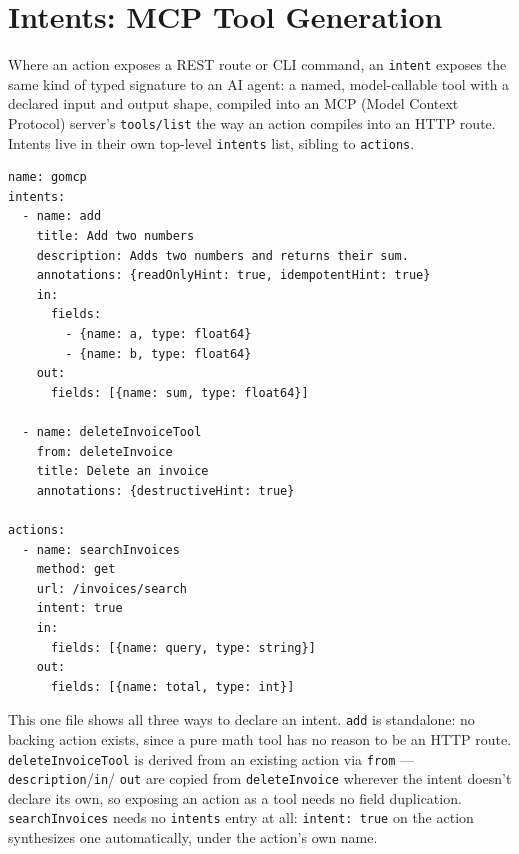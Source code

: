 \section{Intents: MCP Tool Generation}
\label{sec:intents}

Where an action exposes a REST route or CLI command, an
\texttt{intent} exposes the same kind of typed signature to an AI
agent: a named, model-callable tool with a declared input and output
shape, compiled into an MCP (Model Context Protocol) server's
\texttt{tools/list} the way an action compiles into an HTTP route.
Intents live in their own top-level \texttt{intents} list, sibling to
\texttt{actions}.

\begin{lstlisting}
name: gomcp
intents:
  - name: add
    title: Add two numbers
    description: Adds two numbers and returns their sum.
    annotations: {readOnlyHint: true, idempotentHint: true}
    in:
      fields:
        - {name: a, type: float64}
        - {name: b, type: float64}
    out:
      fields: [{name: sum, type: float64}]

  - name: deleteInvoiceTool
    from: deleteInvoice
    title: Delete an invoice
    annotations: {destructiveHint: true}

actions:
  - name: searchInvoices
    method: get
    url: /invoices/search
    intent: true
    in:
      fields: [{name: query, type: string}]
    out:
      fields: [{name: total, type: int}]
\end{lstlisting}

This one file shows all three ways to declare an intent. \texttt{add}
is standalone: no backing action exists, since a pure math tool has no
reason to be an HTTP route. \texttt{deleteInvoiceTool} is derived from
an existing action via \texttt{from} --- \texttt{description}/\texttt{in}/
\texttt{out} are copied from \texttt{deleteInvoice} wherever the
intent doesn't declare its own, so exposing an action as a tool needs
no field duplication. \texttt{searchInvoices} needs no \texttt{intents}
entry at all: \texttt{intent: true} on the action synthesizes one
automatically, under the action's own name.

